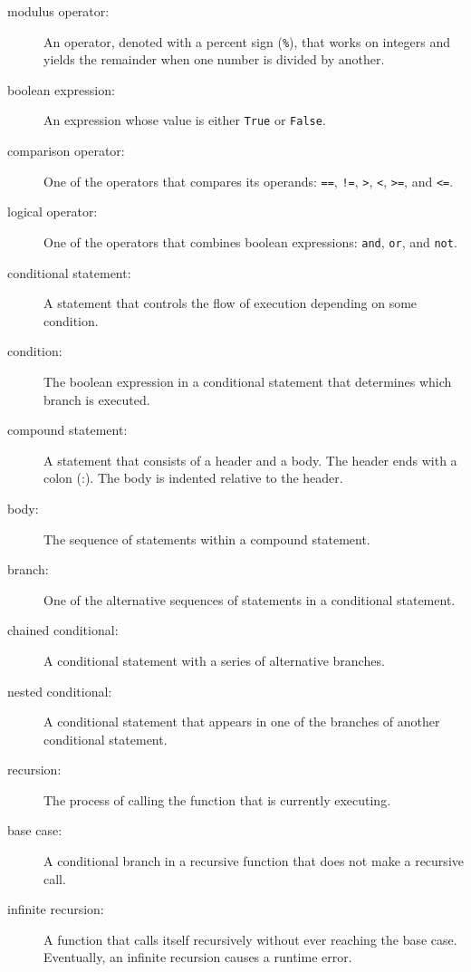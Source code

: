 \documentclass[10pt]{book}
\begin{document}
\begin{description}

\item[modulus operator:]  An operator, denoted with a percent sign
({\tt \%}), that works on integers and yields the remainder when one
number is divided by another.

\item[boolean expression:]  An expression whose value is either 
{\tt True} or {\tt False}.

\item[comparison operator:] One of the operators that compares
its operands: {\tt ==}, {\tt !=}, {\tt >}, {\tt <}, {\tt >=}, and {\tt <=}.

\item[logical operator:] One of the operators that combines boolean
expressions: {\tt and}, {\tt or}, and {\tt not}.

\item[conditional statement:]  A statement that controls the flow of
execution depending on some condition.

\item[condition:] The boolean expression in a conditional statement
that determines which branch is executed.

\item[compound statement:]  A statement that consists of a header
and a body.  The header ends with a colon (:).  The body is indented
relative to the header.

\item[body:] The sequence of statements within a compound statement.

\item[branch:] One of the alternative sequences of statements in
a conditional statement.

\item[chained conditional:]  A conditional statement with a series
of alternative branches.

\item[nested conditional:]  A conditional statement that appears
in one of the branches of another conditional statement.

\item[recursion:]  The process of calling the function that is
currently executing.

\item[base case:]  A conditional branch in a
recursive function that does not make a recursive call.

\item[infinite recursion:]  A function that calls itself recursively
without ever reaching the base case.  Eventually, an infinite recursion
causes a runtime error.

\end{description}
\end{document}

